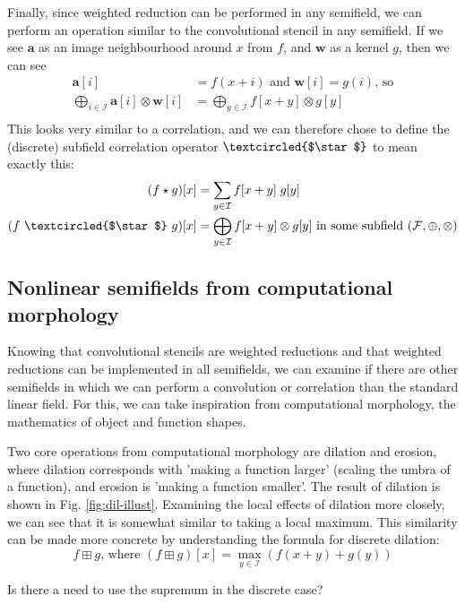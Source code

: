 \documentclass[11pt]{article} %
\def\comment#1{\color{red}#1\color{black}}
\begin{document}
Finally, since weighted reduction can be performed in any semifield, we can perform an operation similar to the convolutional stencil in any semifield. If we see $\mathbf{a}$ as an image neighbourhood around $x$ from $f$, and $\mathbf{w}$ as a kernel $g$, then we can see
\begin{align*}
\mathbf{a}[i] &= f(x + i) \textrm{ and } \mathbf{w}[i] = g(i) \textrm{, so} \\
\bigoplus_{i\in \mathcal{I}}\mathbf{a}[i] \otimes \mathbf{w}[i]
&= \bigoplus_{y\in \mathcal{I}}f[x+y] \otimes g[y] \\
\end{align*}
This looks very similar to a correlation, and we can therefore chose to define the (discrete) subfield correlation operator $\textcircled{$\star$}$ to mean exactly this:
\begin{align*}
	(f \star g)[x] &= \sum_{y\in\mathcal{I}}f[x+y]\; g[y]\\
	(f ~\textcircled{$\star$}~ g)[x] &=\bigoplus_{y\in \mathcal{I}}f[x+y] \otimes g[y] \textrm{ in some subfield $(\mathcal{F}, \oplus, \otimes)$}
\end{align*}
\subsection{Nonlinear semifields from computational morphology}
Knowing that convolutional stencils are weighted reductions and that weighted reductions can be implemented in all semifields, we can examine if there are other semifields in which we can perform a convolution or correlation than the standard linear field. For this, we can take inspiration from computational morphology, the mathematics of object and function shapes.

Two core operations from computational morphology are dilation and erosion, where dilation corresponds with 'making a function larger' (scaling the umbra of a function), and erosion is 'making a function smaller'. The result of dilation is shown in Fig. \ref{fig:dil-illust}. Examining the local effects of dilation more closely, we can see that it is somewhat similar to taking a local maximum. This similarity can be made more concrete by understanding the formula for discrete dilation: 
$$f \boxplus g \textrm{, where }(f \boxplus g)[x] = \max_{y\in\mathcal{I}} \left(f(x+y) + g(y)\right)$$

\comment{Is there a need to use the supremum in the discrete case?}
\end{document}
